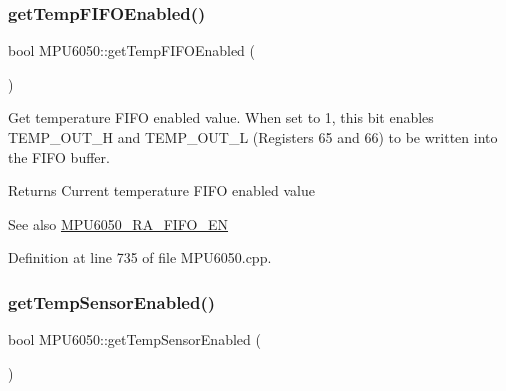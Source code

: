 \subsubsection{\texorpdfstring{getTempFIFOEnabled()}{getTempFIFOEnabled()}}
{\footnotesize\ttfamily bool M\+P\+U6050\+::get\+Temp\+F\+I\+F\+O\+Enabled (\begin{DoxyParamCaption}{ }\end{DoxyParamCaption})}

Get temperature F\+I\+FO enabled value. When set to 1, this bit enables T\+E\+M\+P\+\_\+\+O\+U\+T\+\_\+H and T\+E\+M\+P\+\_\+\+O\+U\+T\+\_\+L (Registers 65 and 66) to be written into the F\+I\+FO buffer. \begin{DoxyReturn}{Returns}
Current temperature F\+I\+FO enabled value 
\end{DoxyReturn}
\begin{DoxySeeAlso}{See also}
\mbox{\hyperlink{MPU6050_8h_a1166fe50f4792f3266e15dc3273e375d}{M\+P\+U6050\+\_\+\+R\+A\+\_\+\+F\+I\+F\+O\+\_\+\+EN}} 
\end{DoxySeeAlso}


Definition at line 735 of file M\+P\+U6050.\+cpp.


\begin{DoxyCode}{0}

\end{DoxyCode}
\mbox{\label{classMPU6050_a31f588beab6760258212c65725eba336}} 
\subsubsection{\texorpdfstring{getTempSensorEnabled()}{getTempSensorEnabled()}}
{\footnotesize\ttfamily bool M\+P\+U6050\+::get\+Temp\+Sensor\+Enabled (\begin{DoxyParamCaption}{ }\end{DoxyParamCaption})}

